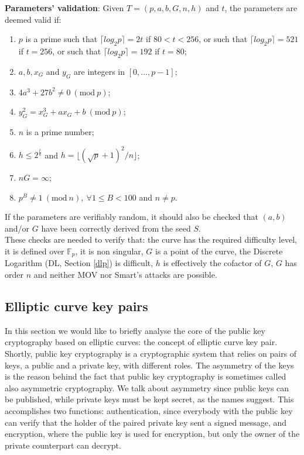 \bigskip
\noindent
{\bf Parameters' validation}: Given $T = (p, a, b, G, n, h)$ and $t$, the parameters are deemed valid if:
\begin{enumerate}
	\item $p$ is a prime such that $\lceil log_2p\rceil = 2t$ if $80 < t < 256$, or such that $\lceil log_2p\rceil = 521$ if $t = 256$, or such that $\lceil log_2p\rceil = 192$ if $t = 80$;
	\item $a, b, x_G$ and $y_G$ are integers in $[0, ..., p - 1]$;
	\item $4a^3 + 27b^2 \neq 0 \ (\text{mod} \ p)$;
	\item $y_G^2 = x_G^3 + ax_G + b \ (\text{mod} \ p)$;
	\item $n$ is a prime number;
	\item $h \leq 2^{\frac{t}{8}}$ and $h = \lfloor (\sqrt{p} + 1)^2 / n \rfloor$;
	\item $nG = \infty$;
	\item $p^B \neq 1 \ (\text{mod} \ n), \ \forall 1 \leq B < 100$ and $n \neq p$. 
\end{enumerate}
If the parameters are verifiably random, it should also be checked that $(a, b)$ and/or $G$ have been correctly derived from the seed $S$.
\\
These checks are needed to verify that: the curve has the required difficulty level, it is defined over $\mathbb{F}_p$, it is non singular, $G$ is a point of the curve, the Discrete Logarithm (DL, Section \ref{dlp}) is difficult, $h$ is effectively the cofactor of $G$, $G$ has order $n$ and neither MOV nor Smart's attacks are possible.

\bigskip

\subsection{Elliptic curve key pairs}
\label{keypairs}
In this section we would like to briefly analyse the core of the public key cryptography based on elliptic curves: the concept of elliptic curve key pair. Shortly, public key cryptography is a cryptographic system that relies on pairs of keys, a public and a private key, with different roles. The asymmetry of the keys is the reason behind the fact that public key cryptography is sometimes called also asymmetric cryptography. We talk about asymmetry since public keys can be published, while private keys must be kept secret, as the names suggest. This accomplishes two functions: authentication, since everybody with the public key can verify that the holder of the paired private key sent a signed message, and encryption, where the public key is used for encryption, but only the owner of the private counterpart can decrypt.

